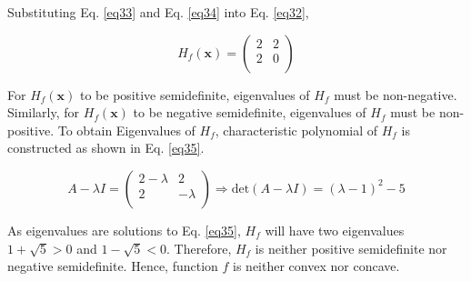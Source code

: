 Substituting Eq. \ref{eq33} and Eq. \ref{eq34} into Eq. \ref{eq32},

\begin{equation}
H_f(\mathbf{x}) = \begin{pmatrix}2 & 2\\2 & 0\\\end{pmatrix}
\end{equation}

For $H_f(\mathbf{x})$ to be positive semidefinite, eigenvalues of $H_f$ must be non-negative. Similarly, for $H_f(\mathbf{x})$ to be negative semidefinite, eigenvalues of $H_f$ must be non-positive. To obtain Eigenvalues of $H_f$, characteristic polynomial of $H_f$ is constructed as shown in Eq. \ref{eq35}.

\begin{equation}
A-\lambda I = \begin{pmatrix}2-\lambda & 2\\ 2 & -\lambda\\\end{pmatrix}\Rightarrow \text{det}(A-\lambda I) = (\lambda - 1)^2 -5
\label{eq35}
\end{equation}

As eigenvalues are solutions to Eq. \ref{eq35}, $H_f$ will have two eigenvalues $1+\sqrt{5} > 0$ and $1-\sqrt{5} < 0$. Therefore, $H_f$ is neither positive semidefinite nor negative semidefinite. Hence, function $f$ is neither convex nor concave.
